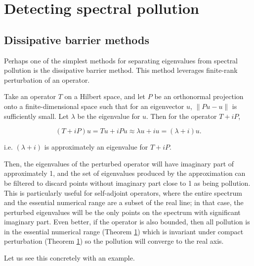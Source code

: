 \documentclass[../main.tex]{subfiles}
\begin{document}
\section{Detecting spectral pollution}

\subsection{Dissipative barrier methods}\label{sec:dissipative-barrier}
Perhaps one of the simplest methods for separating eigenvalues from spectral pollution is the dissipative barrier method.
This method leverages finite-rank perturbation of an operator.

Take an operator $T$ on a Hilbert space, and
let $P$ be an orthonormal projection onto a finite-dimensional space  such that for an eigenvector $u$, $\|Pu - u\|$ is sufficiently small.
Let $\lambda$ be the eigenvalue for $u$. Then for the operator $T+iP$,

$$(T+iP) u = Tu + iPu \approx \lambda u + iu = (\lambda + i)u.$$

i.e. $(\lambda + i)$ is approximately an eigenvalue for $T+iP$. 

Then, the eigenvalues of the perturbed operator will have imaginary part of approximately 1, and the set of eigenvalues produced by the approximation 
can be filtered to discard points without imaginary part close to 1 as being pollution. This is particularly useful for self-adjoint operators, where the entire spectrum and the essential numerical range are a subset of the real line; in that case, the perturbed eigenvalues will be the only points on the spectrum with significant imaginary part. Even better, if the operator is also bounded, then all pollution is in the essential numerical range (Theorem \ref{}) which is
invariant under compact perturbation (Theorem \ref{}) so the pollution will converge to the real axis.

Let us see this concretely with an example.
\end{document}
